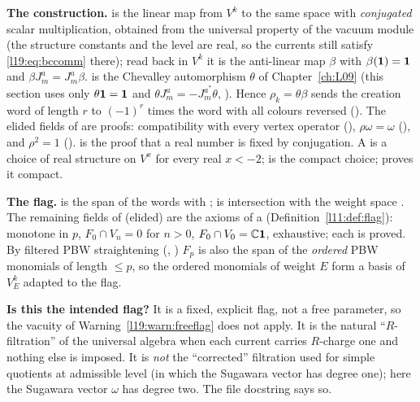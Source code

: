 \begin{dictionary}
\textbf{The construction.}  is the linear map from $V^k$ to the same space with
\emph{conjugated} scalar multiplication, obtained from the universal property of the vacuum module (the
structure constants and the level are real, so the currents still satisfy \eqref{l19:eq:bccomm} there); read back
in $V^k$ it is the anti-linear map $\beta$ with $\beta(\mathbf{1}) = \mathbf{1}$ and $\beta J^a_m = J^a_m\beta$.
 is the Chevalley automorphism $\theta$ of Chapter~\ref{ch:L09}
(this section uses only $\theta\mathbf{1} = \mathbf{1}$ and $\theta J^a_m = -J^{a^*}_m\theta$,
). Hence $\rho_k = \theta\beta$ sends the creation word of length $r$ to $(-1)^r$
times the word with all colours reversed (). The elided fields of
 are proofs: compatibility with every vertex operator (), $\rho\omega = \omega$
(), and $\rho^2 = 1$ ().  is the proof that
a real number is fixed by conjugation. A  is a choice of real structure on $V^x$ for every real
$x<-2$;  is the compact choice;  proves it compact.

\textbf{The flag.}  is the span of the words with ;
 is intersection with the weight space . The remaining fields of
 (elided) are the axioms of a  (Definition~\ref{l11:def:flag}): monotone in
$p$, $F_0\cap V_n = 0$ for $n>0$, $F_0\cap V_0 = {\mathbb{C}}\mathbf{1}$, exhaustive; each is proved. By filtered PBW
straightening (, ) $F_p$ is also the
span of the \emph{ordered} PBW monomials of length $\le p$, so the ordered monomials of weight $E$ form a basis of
$V^k_E$ adapted to the flag.

\textbf{Is this the intended flag?} It is a fixed, explicit flag, not a free parameter, so the vacuity of
Warning~\ref{l19:warn:freeflag} does not apply. It is the natural ``$R$-filtration'' of the universal algebra
when each current carries $R$-charge one and nothing else is imposed. It is \emph{not} the ``corrected''
filtration used for simple quotients at admissible level (in which the Sugawara vector has degree one); here
the Sugawara vector $\omega$ has degree two. The file docstring says so.
\end{dictionary}

